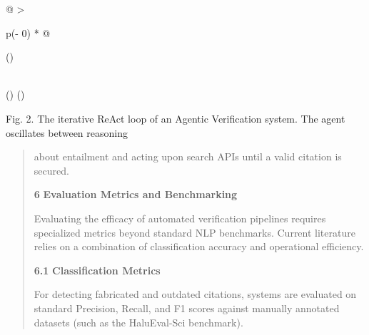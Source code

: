 \documentclass[
]{article}
\begin{document}
\begin{longtable}[]{@{}
  >{\raggedright\arraybackslash}p{(\columnwidth - 0\tabcolsep) * }@{}}
\toprule()
\begin{minipage}[b]{\linewidth}\raggedright
\end{minipage} \\
\midrule()
\endhead
\bottomrule()
\end{longtable}

Fig. 2. The iterative ReAct loop of an Agentic Verification system. The
agent oscillates between reasoning

\begin{quote}
about entailment and acting upon search APIs until a valid citation is
secured.

\textbf{6} \textbf{Evaluation Metrics and Benchmarking}

Evaluating the efficacy of automated verification pipelines requires
specialized metrics beyond standard NLP benchmarks. Current literature
relies on a combination of classification accuracy and operational
efficiency.

\textbf{6.1} \textbf{Classification Metrics}

For detecting fabricated and outdated citations, systems are evaluated
on standard Precision, Recall, and F1 scores against manually annotated
datasets (such as the HaluEval-Sci benchmark).
\end{quote}
\end{document}
